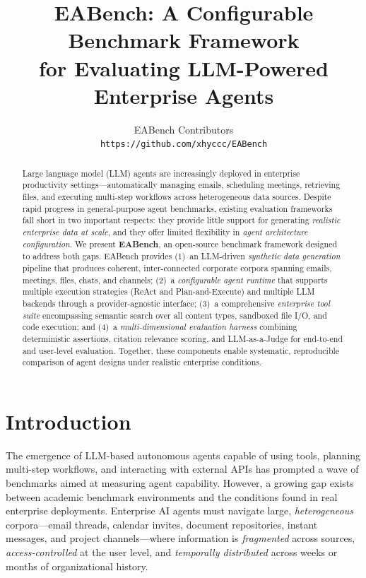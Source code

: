 \documentclass[10pt,twocolumn]{article}
\title{\textbf{EABench: A Configurable Benchmark Framework\\for Evaluating LLM-Powered Enterprise Agents}}
\author{
  EABench Contributors\\
  \texttt{https://github.com/xhyccc/EABench}
}
\date{}
\begin{document}
\maketitle

\begin{abstract}
Large language model (LLM) agents are increasingly deployed in enterprise
productivity settings---automatically managing emails, scheduling meetings,
retrieving files, and executing multi-step workflows across heterogeneous data
sources.  Despite rapid progress in general-purpose agent benchmarks, existing
evaluation frameworks fall short in two important respects: they provide little
support for generating \emph{realistic enterprise data at scale}, and they
offer limited flexibility in \emph{agent architecture configuration}.  We
present \textbf{EABench}, an open-source benchmark framework designed to
address both gaps.  EABench provides (1)~an LLM-driven \emph{synthetic data
generation} pipeline that produces coherent, inter-connected corporate corpora
spanning emails, meetings, files, chats, and channels; (2)~a
\emph{configurable agent runtime} that supports multiple execution strategies
(ReAct and Plan-and-Execute) and multiple LLM backends through a
provider-agnostic interface; (3)~a comprehensive \emph{enterprise tool suite}
encompassing semantic search over all content types, sandboxed file I/O, and
code execution; and (4)~a \emph{multi-dimensional evaluation harness} combining
deterministic assertions, citation relevance scoring, and LLM-as-a-Judge for
end-to-end and user-level evaluation.  Together, these components enable
systematic, reproducible comparison of agent designs under realistic enterprise
conditions.
\end{abstract}

\section{Introduction}
\label{sec:intro}

The emergence of LLM-based autonomous agents capable of using tools, planning
multi-step workflows, and interacting with external APIs has prompted a wave of
benchmarks aimed at measuring agent capability.  However, a growing gap exists
between academic benchmark environments and the conditions found in real
enterprise deployments.  Enterprise AI agents must navigate large,
\emph{heterogeneous} corpora---email threads, calendar invites, document
repositories, instant messages, and project channels---where information is
\emph{fragmented} across sources, \emph{access-controlled} at the user level,
and \emph{temporally distributed} across weeks or months of organizational
history.
\end{document}
